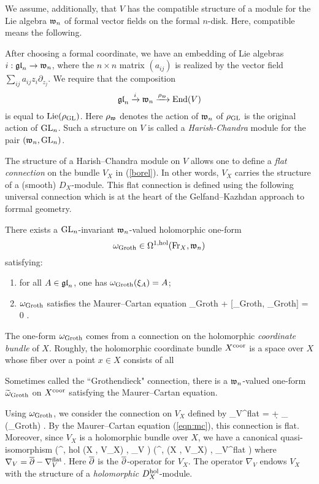 \documentclass[11pt]{amsart}
\begin{document}
We assume, additionally, that $V$ has the compatible structure of a module for the Lie algebra $\fw_n$ of formal vector fields on the formal $n$-disk.
Here, compatible means the following.

After choosing a formal coordinate, we have an embedding of Lie algebras $i : \fgl_n \to \fw_n$, where the $n\times n$ matrix $(a_{ij})$ is realized by the vector field $\sum_{ij} a_{ij} z_i \partial_{z_j}$.
We require that the composition 
\[
\fgl_n \xto{i} \fw_n \xto{\rho_\fw} {\rm End}(V) 
\]
is equal to ${\rm Lie}(\rho_{\rm GL})$. 
Here $\rho_{\fw}$ denotes the action of $\fw_n$ of $\rho_{\rm GL}$ is the original action of $\GL_n$. 
Such a structure on $V$ is called a {\em Harish-Chandra} module for the pair $(\fw_n, \GL_n)$. 

The structure of a Harish--Chandra module on $V$ allows one to define a {\em flat connection} on the bundle $V_X$ in (\ref{borel}). 
In other words, $V_X$ carries the structure of a (smooth) $D_X$-module. 
This flat connection is defined using the following universal connection which is at the heart of the Gelfand--Kazhdan approach to forrmal geometry. 

There exists a $\GL_n$-invariant $\fw_n$-valued holomorphic one-form
\[
\omega_{\rm Groth} \in \Omega^{1, \rm hol}({\rm Fr}_X , \fw_n)
\]
satisfying:
\begin{enumerate}
\item \label{groth1} for all $A \in \fgl_n$, one has $\omega_{\rm Groth} (\xi_A) = A$;
\item \label{gorth2} $\omega_{\rm Groth}$ satisfies the Maurer--Cartan equation
\beqn\label{eqn:mc}
\partial \omega_{\rm Groth} +  [\omega_{\rm Groth}, \omega_{\rm Groth}] = 0 .
\eeqn
\end{enumerate}

\begin{rmk}
The one-form $\omega_{\rm Groth}$ comes from a connection on the holomorphic {\em coordinate bundle} of $X$. 
Roughly, the holomorphic coordinate bundle $X^{\rm coor}$ is a space over $X$ whose fiber over a point $x \in X$ consists of all 

Sometimes called the ``Grothendieck" connection, there is a $\fw_n$-valued one-form $\Tilde{\omega}_{\rm Groth}$ on $X^{\rm coor}$ satisfying the Maurer--Cartan equation.
\end{rmk}

Using $\omega_{\rm Groth}$, we consider the connection on $V_X$ defined by
\beqn
\nabla_V^{\rm flat} = \d + \rho_{\fw} (\omega_{\rm Groth}) .
\eeqn
By the Maurer--Cartan equation (\ref{eqn:mc}), this connection is flat. 
Moreover, since $V_X$ is a holomorphic bundle over $X$, we have a canonical quasi-isomorphism
\beqn
\left(\Omega^{\bu, \rm hol} (X , V_X) \; , \; \nabla_V \right) \xto{\simeq}\left(\Omega^{\bu, \bu} (X , V_X) \; , \; \nabla_V^{\rm flat} \right) 
\eeqn 
where $\nabla_V = \dbar -  \nabla_V^{\rm flat}$.
Here $\dbar$ is the $\dbar$-operator for $V_X$.
The operator $\nabla_V$ endows $V_X$ with the structure of a {\em holomorphic} $D^{\rm hol}_X$-module.
\end{document}
